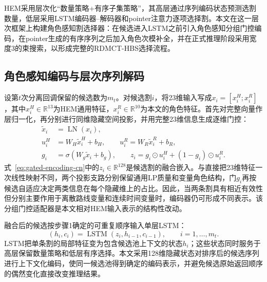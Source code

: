 \documentclass[final,5p,times,twocolumn]{elsarticle}
\begin{document}
HEM采用层次化“数量策略+有序子集策略”，其高层通过序列编码状态预测选割数量，低层采用LSTM编码器--解码器和pointer注意力逐项选择割\citep{wang2023hem,vinyals2015pointer}。本文在这一层次框架上构建角色感知割选择器：在候选进入LSTM之前引入角色感知分组门控编码，在pointer生成的有序序列之后加入角色次模补全，并在正式推理阶段采用宽度3的束搜索，以形成完整的RDMCT-HBS选择流程。


\subsection{角色感知编码与层次序列解码}

设第$t$次分离回调保留的候选数为$m_t$。对候选割$i$，将23维输入写成$x_i=[x_i^{H};x_i^{R}]$，其中$x_i^{H}\in\mathbb R^{13}$为HEM通用特征，$x_i^{R}\in\mathbb R^{10}$为本文的角色特征。首先对完整向量作层归一化，再分别进行同维隐藏空间投影，并用完整23维信息生成逐维门控：
\begin{equation}
\begin{aligned}
\widetilde x_i&=\operatorname{LN}(x_i),\\
u_i^{H}&=W_H\widetilde x_i^{H}+b_H,\qquad
u_i^{R}=W_R\widetilde x_i^{R}+b_R,\\
g_i&=\sigma(W_g\widetilde x_i+b_g),\qquad
z_i=g_i\odot u_i^{H}+(1-g_i)\odot u_i^{R}.
\end{aligned}
\label{eq:gated-encoding-cn}
\end{equation}
式~\eqref{eq:gated-encoding-cn}中的$z_i\in\mathbb R^{128}$是候选割的融合嵌入。与直接把23维特征一次线性映射不同，两个投影支路分别保留通用LP质量和变量角色结构，门$g_i$再按候选自适应决定两类信息在每个隐藏维上的占比。因此，当两条割具有相近有效性但分别主要作用于离散路线变量和连续时间变量时，编码器仍可形成不同表示。该分组门控适配器是本文相对HEM输入表示的结构性改动。

融合后的候选按步骤1确定的可重复顺序输入单层LSTM：
\begin{equation}
(h_i,c_i)=\operatorname{LSTM}(z_i,h_{i-1},c_{i-1}),\qquad i=1,\ldots,m_t .
\label{eq:lstm-encoding-cn}
\end{equation}
LSTM把单条割的局部特征变为包含候选池上下文的状态$h_i$；这些状态同时服务于高层保留数量策略和低层有序选择。本文采用128维隐藏状态对排序后的候选序列进行上下文化编码，使同一候选池得到确定的编码表示，并避免候选原始返回顺序的偶然变化直接改变推理结果。
\end{document}
